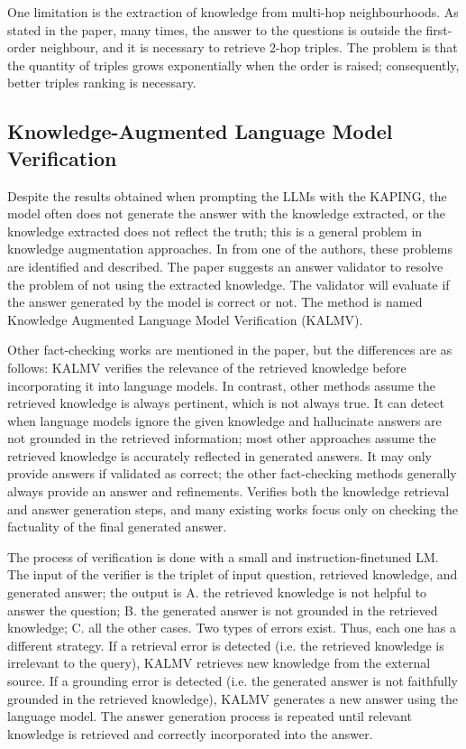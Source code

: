 \documentclass{article}
\begin{document}
One limitation is the extraction of knowledge from multi-hop neighbourhoods. As stated in the paper, many times, the answer to the questions is outside the first-order neighbour, and it is necessary to retrieve 2-hop triples. The problem is that the quantity of triples grows exponentially when the order is raised; consequently, better triples ranking is necessary.


\subsection{Knowledge-Augmented Language Model Verification}

Despite the results obtained when prompting the LLMs with the KAPING, the model often does not generate the answer with the knowledge extracted, or the knowledge extracted does not reflect the truth; this is a general problem in knowledge augmentation approaches. In \cite{baek2023knowledgeaugmentedlanguagemodelverification} from one of the authors, these problems are identified and described. The paper suggests an answer validator to resolve the problem of not using the extracted knowledge. The validator will evaluate if the answer generated by the model is correct or not. The method is named Knowledge Augmented Language Model Verification (KALMV).

Other fact-checking works are mentioned in the paper, but the differences are as follows: KALMV verifies the relevance of the retrieved knowledge before incorporating it into language models. In contrast, other methods assume the retrieved knowledge is always pertinent, which is not always true. It can detect when language models ignore the given knowledge and hallucinate answers are not grounded in the retrieved information; most other approaches assume the retrieved knowledge is accurately reflected in generated answers. It may only provide answers if validated as correct; the other fact-checking methods generally always provide an answer and refinements. Verifies both the knowledge retrieval and answer generation steps, and many existing works focus only on checking the factuality of the final generated answer.

The process of verification is done with a small and instruction-finetuned LM. The input of the verifier is the triplet of input question, retrieved knowledge, and generated answer; the output is A. the retrieved knowledge is not helpful to answer the question; B. the generated answer is not grounded in the retrieved knowledge; C. all the other cases. Two types of errors exist. Thus, each one has a different strategy. If a retrieval error is detected (i.e. the retrieved knowledge is irrelevant to the query), KALMV retrieves new knowledge from the external source. If a grounding error is detected (i.e. the generated answer is not faithfully grounded in the retrieved knowledge), KALMV generates a new answer using the language model. The answer generation process is repeated until relevant knowledge is retrieved and correctly incorporated into the answer.
\end{document}
